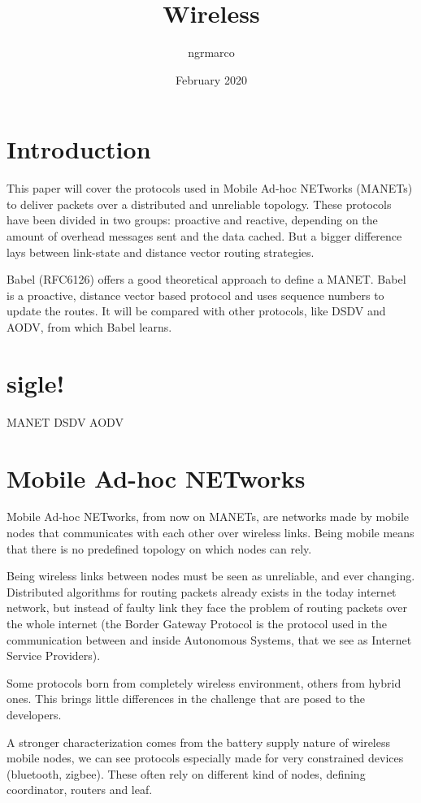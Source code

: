 \documentclass{article}
\title{Wireless}
\author{ngrmarco }
\date{February 2020}
\begin{document}
\maketitle

\section{Introduction}

This paper will cover the protocols used in Mobile Ad-hoc NETworks (MANETs) to deliver packets over a distributed and unreliable topology.
These protocols have been divided in two groups: proactive and reactive, depending on the amount of overhead messages sent and the data cached.
But a bigger difference lays between link-state and distance vector routing strategies.

Babel (RFC6126) offers a good theoretical approach to define a MANET.
Babel is a proactive, distance vector based protocol and uses sequence numbers to update the routes.
It will be compared with other protocols, like DSDV and AODV,  from which Babel learns.

\section{sigle!}

MANET
DSDV
AODV

\section{Mobile Ad-hoc NETworks}

Mobile Ad-hoc NETworks, from now on MANETs, are networks made by mobile nodes that communicates with each other over wireless links.
Being mobile means that there is no predefined topology on which nodes can rely.


Being wireless links between nodes must be seen as unreliable, and ever changing.
Distributed algorithms for routing packets already exists in the today internet network, but instead of faulty link they face the problem of routing packets over the whole internet (the Border Gateway Protocol is the protocol used in the communication between and inside Autonomous Systems, that we see as Internet Service Providers).

Some protocols born from completely wireless environment, others from hybrid ones. This brings little differences in the challenge that are posed to the developers.

A stronger characterization comes from the battery supply nature of wireless mobile nodes, we can see protocols especially made for very constrained devices (bluetooth, zigbee). These often rely on different kind of nodes, defining coordinator, routers and leaf.
\end{document}
